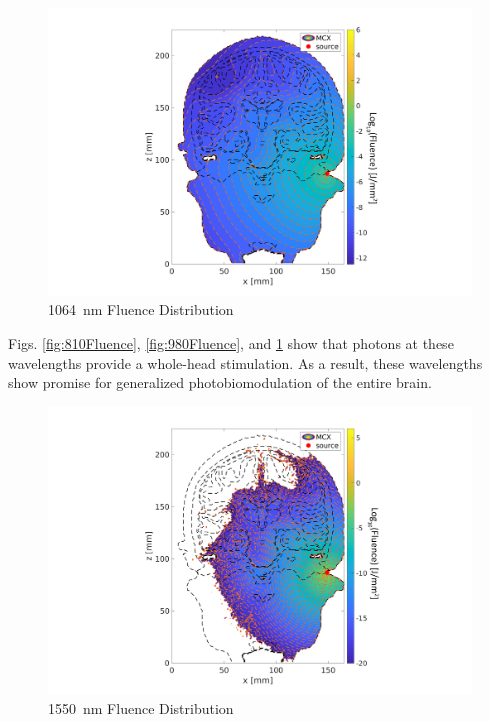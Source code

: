 \documentclass[journal,twoside,web]{ieeecolor}
\begin{document}
\begin{figure}[hbt!]
    \includegraphics[width=\linewidth]{Figures/Fluence_Distribution_1064nm_Cochlear.png}
    \caption{1064~nm Fluence Distribution}
    \label{fig:1064Fluence}
\end{figure}

Figs. \ref{fig:810Fluence}, \ref{fig:980Fluence}, and \ref{fig:1064Fluence} show that photons at these wavelengths provide a whole-head stimulation. As a result, 
these wavelengths show promise for generalized photobiomodulation of the entire brain. 

\begin{figure}[hbt!]
    \includegraphics[width=\linewidth]{Figures/Fluence_Distribution_1550nm_Cochlear.png}
    \caption{1550~nm Fluence Distribution}
    \label{fig:1550Fluence}
\end{figure}
\end{document}
